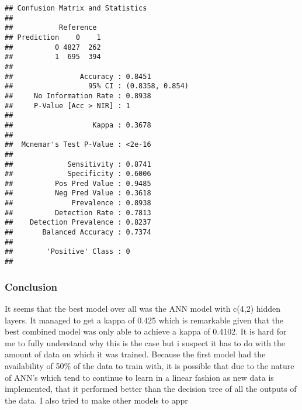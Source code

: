 \documentclass[
]{article}
\begin{document}
\begin{verbatim}
## Confusion Matrix and Statistics
## 
##           Reference
## Prediction    0    1
##          0 4827  262
##          1  695  394
##                                          
##                Accuracy : 0.8451         
##                  95% CI : (0.8358, 0.854)
##     No Information Rate : 0.8938         
##     P-Value [Acc > NIR] : 1              
##                                          
##                   Kappa : 0.3678         
##                                          
##  Mcnemar's Test P-Value : <2e-16         
##                                          
##             Sensitivity : 0.8741         
##             Specificity : 0.6006         
##          Pos Pred Value : 0.9485         
##          Neg Pred Value : 0.3618         
##              Prevalence : 0.8938         
##          Detection Rate : 0.7813         
##    Detection Prevalence : 0.8237         
##       Balanced Accuracy : 0.7374         
##                                          
##        'Positive' Class : 0              
## 
\end{verbatim}

\hypertarget{conclusion}{%
\subsubsection{Conclusion}\label{conclusion}}

It seems that the best model over all was the ANN model with c(4,2)
hidden layers. It managed to get a kappa of 0.425 which is remarkable
given that the best combined model was only able to achieve a kappa of
0.4102. It is hard for me to fully understand why this is the case but i
suspect it has to do with the amount of data on which it was trained.
Because the first model had the availability of 50\% of the data to
train with, it is possible that due to the nature of ANN's which tend to
continue to learn in a linear fashion as new data is implemented, that
it performed better than the decision tree of all the outputs of the
data. I also tried to make other models to appr
\end{document}

